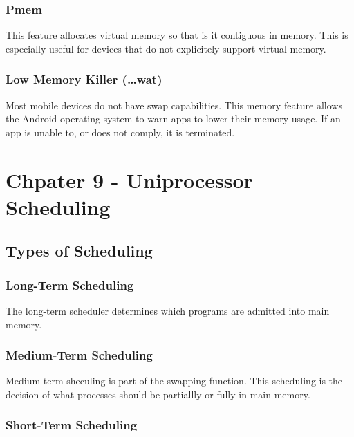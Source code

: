 \documentclass[11pt]{article}
\begin{document}
\subsubsection{Pmem}
\label{sec:orgheadline82}

This feature allocates virtual memory so that is it contiguous in memory.
This is especially useful for devices that do not explicitely support
virtual memory.

\subsubsection{Low Memory Killer (\ldots{}wat)}
\label{sec:orgheadline83}

Most mobile devices do not have swap capabilities. This memory feature allows
the Android operating system to warn apps to lower their memory usage. If an
app is unable to, or does not comply, it is terminated.


\section{Chpater 9 - Uniprocessor Scheduling}
\label{sec:orgheadline97}

\subsection{Types of Scheduling}
\label{sec:orgheadline89}

\subsubsection{Long-Term Scheduling}
\label{sec:orgheadline86}

The long-term scheduler determines which programs are
admitted into main memory.

\subsubsection{Medium-Term Scheduling}
\label{sec:orgheadline87}

Medium-term sheculing is part of the swapping function. This scheduling
is the decision of what processes should be partiallly or fully in main
memory.

\subsubsection{Short-Term Scheduling}
\label{sec:orgheadline88}
\end{document}
